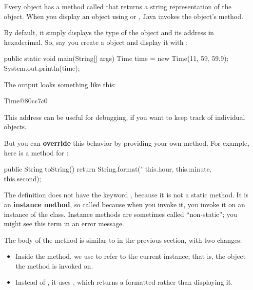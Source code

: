 Every object has a method called  that returns a string representation of the object.
When you display an object using  or , Java invokes the object's  method.


By default, it simply displays the type of the object and its address in hexadecimal.
So, say you create a  object and display it with :

\begin{code}
public static void main(String[] args) {
    Time time = new Time(11, 59, 59.9);
    System.out.println(time);
}
\end{code}


The output looks something like this:

\begin{stdout}
Time@80cc7c0
\end{stdout}


This address can be useful for debugging, if you want to keep track of individual objects.


But you can {\bf override} this behavior by providing your own  method.
For example, here is a  method for :

\begin{code}
public String toString() {
    return String.format("%
        this.hour, this.minute, this.second);
}
\end{code}


The definition does not have the keyword , because it is not a static method.
It is an {\bf instance method}, so called because when you invoke it, you invoke it on an instance of the class.
Instance methods are sometimes called ``non-static''; you might see this term in an error message.

The body of the method is similar to  in the previous section, with two changes:

\begin{itemize}

\item Inside the method, we use  to refer to the current instance; that is, the object the method is invoked on.

\item Instead of , it uses , which returns a formatted  rather than displaying it.

\end{itemize}

